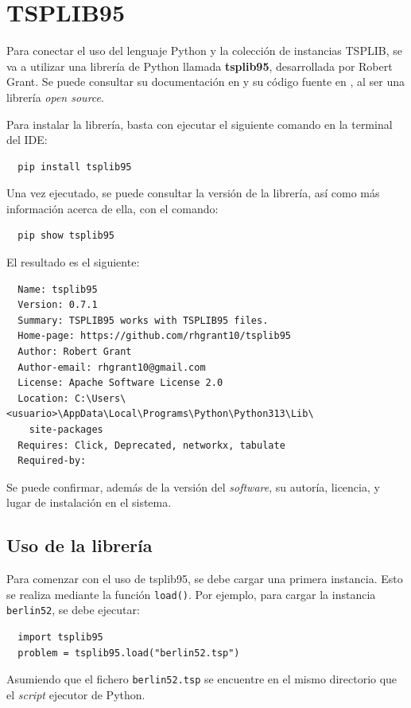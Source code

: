 \section{TSPLIB95}
\label{sec:tsplib95}

Para conectar el uso del lenguaje Python y la colección de instancias TSPLIB, se va a utilizar una librería de Python llamada
\textbf{tsplib95}, desarrollada por Robert Grant. Se puede consultar su documentación en \cite{grant_tsplib95} y su código 
fuente en \cite{grant_github}, al ser una librería \textit{open source}.

Para instalar la librería, basta con ejecutar el siguiente comando en la terminal del \ac{IDE}:
\begin{verbatim}
  pip install tsplib95
\end{verbatim}
Una vez ejecutado, se puede consultar la versión de la librería, así como más información acerca de ella, con el comando:
\begin{verbatim}
  pip show tsplib95
\end{verbatim}
El resultado es el siguiente:
\begin{verbatim}
  Name: tsplib95
  Version: 0.7.1
  Summary: TSPLIB95 works with TSPLIB95 files.
  Home-page: https://github.com/rhgrant10/tsplib95
  Author: Robert Grant
  Author-email: rhgrant10@gmail.com
  License: Apache Software License 2.0
  Location: C:\Users\<usuario>\AppData\Local\Programs\Python\Python313\Lib\
    site-packages
  Requires: Click, Deprecated, networkx, tabulate
  Required-by:
\end{verbatim}
Se puede confirmar, además de la versión del \textit{software}, su autoría, licencia, y lugar de instalación en el sistema.

\subsection{Uso de la librería}
\label{subsec:lib_usage}

Para comenzar con el uso de tsplib95, se debe cargar una primera instancia. Esto se realiza mediante la función \texttt{load()}.
Por ejemplo, para cargar la instancia \texttt{berlin52}, se debe ejecutar:

\begin{verbatim}
  import tsplib95
  problem = tsplib95.load("berlin52.tsp")
\end{verbatim}

Asumiendo que el fichero \texttt{berlin52.tsp} se encuentre en el mismo directorio que el \textit{script} ejecutor de Python.

